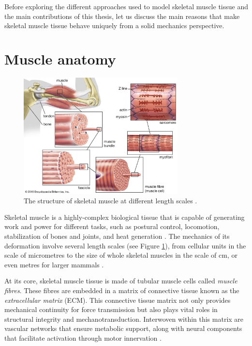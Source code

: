 \documentclass{sfuthesis}
\numberwithin{equation}{section}
\numberwithin{figure}{chapter}
\numberwithin{table}{chapter}
\theoremstyle{definition}
\begin{document}
Before exploring the different approaches used to model skeletal muscle tissue and the main contributions of this thesis, let us discuss the main reasons that make skeletal muscle tissue behave uniquely from a solid mechanics perspective.

\section{Muscle anatomy}

\begin{figure}
    \centering
    \includegraphics[width=0.75\textwidth]{figs/muscle-anatomy.jpg}
    \caption{The structure of skeletal muscle at different length scales \cite{MusclePicture}.}
    \label{fig:muscle_anatomy}
\end{figure}

Skeletal muscle is a highly-complex biological tissue that is capable of generating work and power for different tasks, such as postural control, locomotion, stabilization of bones and joints, and heat generation \cite{HillFirstLast1970,Lieber2010Book}.
The mechanics of its deformation involve several length scales (see Figure \ref{fig:muscle_anatomy}), from cellular units in the scale of micrometres to the size of whole skeletal muscles in the scale of cm, or even metres for larger mammals \cite{Lieber2010Book}.

At its core, skeletal muscle tissue is made of tubular muscle cells called \textit{muscle fibres}. These fibres are embedded in a matrix of connective tissue known as the \textit{extracellular matrix} (ECM). 
This connective tissue matrix not only provides mechanical continuity for force transmission but also plays vital roles in structural integrity and mechanotransduction. Interwoven within this matrix are vascular networks that ensure metabolic support, along with neural components that facilitate activation through motor innervation \cite{GilliesLieber2011ECM,Lieber2010Book, Mahdy2019}. 
\end{document}
